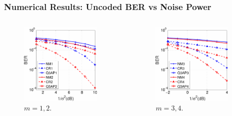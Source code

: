 \documentclass{beamer}
\begin{document}
\begin{frame}
  \frametitle{Numerical Results: Uncoded BER vs Noise Power}
  \begin{columns}
    \begin{figure}
      \includegraphics[width=0.9\textwidth]{figs/BER_noise_power_MonteCarlo_64QAM_23_Q3AP.pdf}
      \caption{$m=1,2$.}
    \end{figure}
    
    \begin{figure}
      \includegraphics[width=0.9\textwidth]{figs/BER_noise_power_MonteCarlo_64QAM_45_Q3AP.pdf}
      \caption{$m=3,4$.}
    \end{figure}
  \end{columns}
\end{frame}
\end{document}
